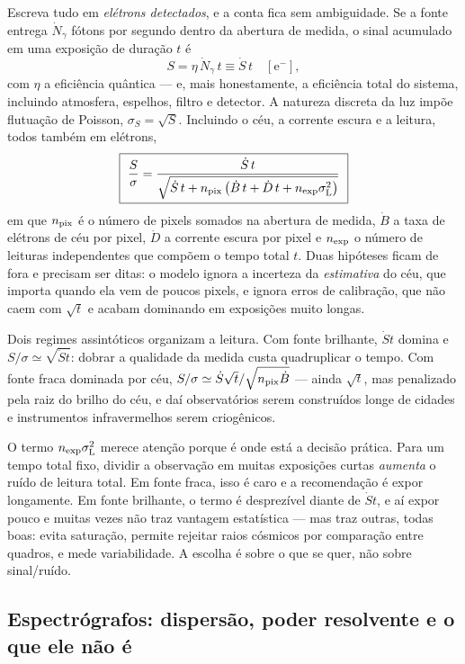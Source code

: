\documentclass[11pt,a4paper]{article}
\begin{document}
Escreva tudo em \emph{elétrons detectados}, e a conta fica sem ambiguidade. Se a fonte entrega $\dot{N}_\gamma$
fótons por segundo dentro da abertura de medida, o sinal acumulado em uma exposição de duração $t$ é
\[
S=\eta\,\dot{N}_\gamma\,t\equiv\dot{S}\,t\quad[\mathrm{e^-}],
\]
com $\eta$ a eficiência quântica --- e, mais honestamente, a eficiência total do sistema, incluindo
atmosfera, espelhos, filtro e detector. A natureza discreta da luz impõe flutuação de Poisson,
$\sigma_S=\sqrt{S}$. Incluindo o céu, a corrente escura e a leitura, todos também em elétrons,
\[
\boxed{\ \frac{S}{\sigma}=\frac{\dot{S}\,t}
{\sqrt{\dot{S}\,t+n_{\rm pix}\left(\dot{B}\,t+\dot{D}\,t+n_{\rm exp}\sigma_{\rm L}^{2}\right)}}\ }
\]
em que $n_{\rm pix}$ é o número de pixels somados na abertura de medida, $\dot{B}$ a taxa de elétrons de céu por
pixel, $\dot{D}$ a corrente escura por pixel e $n_{\rm exp}$ o número de leituras independentes que compõem o
tempo total $t$. Duas hipóteses ficam de fora e precisam ser ditas: o modelo ignora a incerteza da \emph{estimativa}
do céu, que importa quando ela vem de poucos pixels, e ignora erros de calibração, que não caem com $\sqrt{t}$ e
acabam dominando em exposições muito longas.

Dois regimes assintóticos organizam a leitura. Com fonte brilhante, $\dot{S}t$ domina e
$S/\sigma\simeq\sqrt{\dot{S}t}$: dobrar a qualidade da medida custa quadruplicar o tempo. Com fonte fraca
dominada por céu, $S/\sigma\simeq\dot{S}\sqrt{t}/\sqrt{n_{\rm pix}\dot{B}}$ --- ainda $\sqrt{t}$, mas penalizado
pela raiz do brilho do céu, e daí observatórios serem construídos longe de cidades e instrumentos infravermelhos
serem criogênicos.

O termo $n_{\rm exp}\sigma_{\rm L}^{2}$ merece atenção porque é onde está a decisão prática. Para um tempo total
fixo, dividir a observação em muitas exposições curtas \emph{aumenta} o ruído de leitura total. Em fonte fraca,
isso é caro e a recomendação é expor longamente. Em fonte brilhante, o termo é desprezível diante de
$\dot{S}t$, e aí expor pouco e muitas vezes não traz vantagem estatística --- mas traz outras, todas boas:
evita saturação, permite rejeitar raios cósmicos por comparação entre quadros, e mede variabilidade. A escolha é
sobre o que se quer, não sobre sinal/ruído.

\subsection*{Espectrógrafos: dispersão, poder resolvente e o que ele não é}
\end{document}
